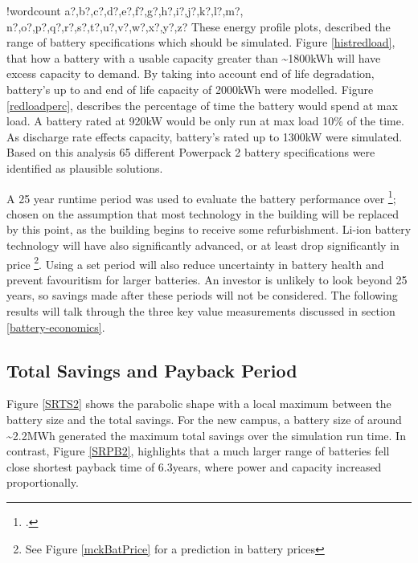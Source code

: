 \documentclass[fontsize=9.5pt]{extarticle}
\numberwithin{figure}{section} %
\newcounter{words}
\newenvironment{counted}{%
  \setcounter{words}{0}
  \SearchList!{wordcount}{\stepcounter{words}}
    {a?,b?,c?,d?,e?,f?,g?,h?,i?,j?,k?,l?,m?,
    n?,o?,p?,q?,r?,s?,t?,u?,v?,w?,x?,y?,z?}
  \UndoBoundary{'}
  \SearchOrder{p;}}{%
  \StopSearching}
\begin{document}
\begin{counted}
These energy profile plots, described the range of battery
specifications which should be simulated. Figure \ref{histredload}, that
how a battery with a usable capacity greater than
\textasciitilde{}1800kWh will have excess capacity to demand. By taking
into account end of life degradation, battery's up to and end of life
capacity of 2000kWh were modelled. Figure \ref{redloadperc}, describes
the percentage of time the battery would spend at max load. A battery
rated at 920kW would be only run at max load 10\% of the time. As
discharge rate effects capacity, battery's rated up to 1300kW were
simulated. Based on this analysis 65 different Powerpack 2 battery
specifications were identified as plausible solutions.

A 25 year runtime period was used to evaluate the battery performance
over \footcite[See Page 27 of][]{heatcibse}; chosen on the assumption
that most technology in the building will be replaced by this point, as
the building begins to receive some refurbishment. Li-ion battery
technology will have also significantly advanced, or at least drop
significantly in price
\footnote{See Figure \ref{mckBatPrice} for a prediction in battery prices}.
Using a set period will also reduce uncertainty in battery health and
prevent favouritism for larger batteries. An investor is unlikely to
look beyond 25 years, so savings made after these periods will not be
considered. The following results will talk through the three key value
measurements discussed in section \ref{battery-economics}.

\subsection{Total Savings and Payback
Period}\label{total-savings-and-payback-period}

Figure \ref{SRTS2} shows the parabolic shape with a local maximum
between the battery size and the total savings. For the new campus, a
battery size of around \textasciitilde{}2.2MWh generated the maximum
total savings over the simulation run time. In contrast, Figure
\ref{SRPB2}, highlights that a much larger range of batteries fell close
shortest payback time of 6.3years, where power and capacity increased
proportionally.


\end{counted}
\end{document}

